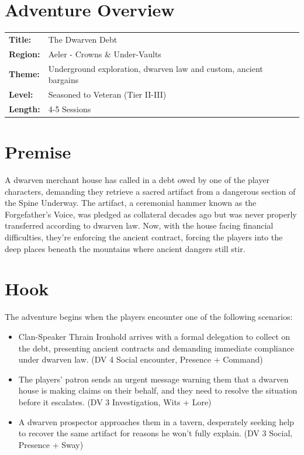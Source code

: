 \documentclass[11pt]{article}
\begin{document}
\section*{Adventure Overview}

\begin{tabularx}{\textwidth}{@{}lX@{}}
\textbf{Title:} & The Dwarven Debt \\
\textbf{Region:} & Aeler - Crowns \& Under-Vaults \\
\textbf{Theme:} & Underground exploration, dwarven law and custom, ancient bargains \\
\textbf{Level:} & Seasoned to Veteran (Tier II-III) \\
\textbf{Length:} & 4-5 Sessions \\
\end{tabularx}


\section{Premise}

A dwarven merchant house has called in a debt owed by one of the player characters, demanding they retrieve a sacred artifact from a dangerous section of the Spine Underway. The artifact, a ceremonial hammer known as the Forgefather's Voice, was pledged as collateral decades ago but was never properly transferred according to dwarven law. Now, with the house facing financial difficulties, they're enforcing the ancient contract, forcing the players into the deep places beneath the mountains where ancient dangers still stir.

\section{Hook}

The adventure begins when the players encounter one of the following scenarios:
\begin{itemize}
\item Clan-Speaker Thrain Ironhold arrives with a formal delegation to collect on the debt, presenting ancient contracts and demanding immediate compliance under dwarven law. (DV 4 Social encounter, Presence + Command)
\item The players' patron sends an urgent message warning them that a dwarven house is making claims on their behalf, and they need to resolve the situation before it escalates. (DV 3 Investigation, Wits + Lore)
\item A dwarven prospector approaches them in a tavern, desperately seeking help to recover the same artifact for reasons he won't fully explain. (DV 3 Social, Presence + Sway)
\end{itemize}
\end{document}
